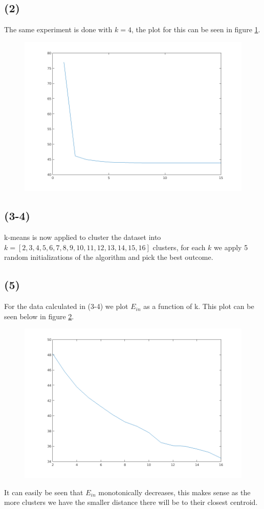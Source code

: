 \documentclass[a4paper]{article}
\begin{document}
\subsection*{(2)}
The same experiment is done with $k=4$, the plot for this can be seen in figure \ref{opg52}.
\begin{figure}[H]
  \centering
  \includegraphics[width=\textwidth]{./52.png}
  \caption{}
  \label{opg52}
\end{figure}
\subsection*{(3-4)}
k-means is now applied to cluster the dataset into $k =[2,3,4,5,6,7,8,9,10,11,12,13,14,15,16]$ clusters, for each $k$ we apply 5 random initializations of the algorithm and pick the best outcome.

\newpage
\subsection*{(5)}
For the data calculated in (3-4) we plot $E_{in}$ as a function of k. This plot can be seen below in figure \ref{opg55}.
\begin{figure}[H]
  \centering
  \includegraphics[width=\textwidth]{./55.png}
  \caption{}
  \label{opg55}
\end{figure}
It can easily be seen that $E_{in}$ monotonically decreases, this makes sense as the more clusters we have the smaller distance there will be to their closest centroid.
\end{document}
